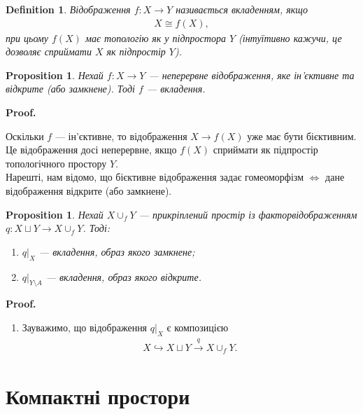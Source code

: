 \documentclass[a4paper, 10pt]{article}
\makeatletter
\theoremstyle{theoremdd}
\newtheorem{definition}[theorem]{Definition}
\newtheorem{proposition}[theorem]{Proposition}
\renewenvironment{proof}[1][Proof.\\]{\par
\pushQED{\hfill \qed}%
\normalfont \topsep6\p@\@plus6\p@\relax
\trivlist
\item\relax
{\bfseries
#1\@addpunct{.}}\hspace\labelsep\ignorespaces
}{%
\popQED\endtrivlist\@endpefalse
}
\makeatother
\begin{document}
\begin{definition}
Відображення $f \colon X \to Y$ називається вкладенням, якщо
\begin{align*}
X \cong f(X),
\end{align*}
при цьому $f(X)$ має топологію як у підпростора $Y$ (\textit{інтуїтивно кажучи, це дозволяє сприймати $X$ як підпростір $Y$}).
\end{definition}

\begin{proposition}
Нехай $f \colon X \to Y$ --- неперервне відображення, яке ін'єктивне та відкрите (або замкнене). Тоді $f$ --- вкладення.
\end{proposition}

\begin{proof}
Оскільки $f$ --- ін'єктивне, то відображення $X \to f(X)$ уже має бути бієктивним. Це відображення досі неперервне, якщо $f(X)$ сприймати як підпростір топологічного простору $Y$.\\
Нарешті, нам відомо, що бієктивне відображення задає гомеоморфізм $\iff$ дане відображення відкрите (або замкнене).
\end{proof}

\begin{proposition}
Нехай $X \cup_f Y$ --- прикріплений простір із факторвідображенням $q \colon X \sqcup Y \to X \cup_f Y$. Тоді:
\begin{enumerate}[nosep,wide=0pt,label={\arabic*)}]
\item $q|_X$ --- вкладення, образ якого замкнене;
\item $q|_{Y \setminus A}$ --- вкладення, образ якого відкрите.
\end{enumerate}
\end{proposition}

\begin{proof}
\begin{enumerate}[topsep=0pt,wide=0pt,label={\arabic*)}]
\item Зауважимо, що відображення $q|_X$ є композицією
\begin{align*}
X \hookrightarrow X \sqcup Y \overset{q}{\to} X \cup_f Y.
\end{align*}
\end{enumerate}
\end{proof}

\newpage
\section{Компактні простори}
\end{document}
